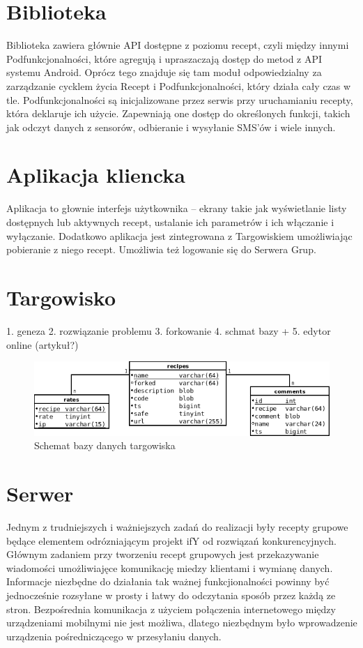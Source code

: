 \documentclass[11pt,a4paper,polish,thesis]{dcsbook}
\begin{document}
\section{Biblioteka}
Biblioteka zawiera głównie API dostępne z poziomu recept, czyli między innymi Podfunkcjonalności, które agregują i upraszaczają dostęp do metod z API systemu Android. Oprócz tego znajduje się tam moduł odpowiedzialny za zarządzanie cycklem życia Recept i Podfunkcjonalności, który działa cały czas w tle. Podfunkcjonalności są inicjalizowane przez serwis przy uruchamianiu recepty, która deklaruje ich użycie. Zapewniają one dostęp do określonych funkcji, takich jak odczyt danych z sensorów, odbieranie i wysyłanie SMS'ów i wiele innych.
\section{Aplikacja kliencka}
Aplikacja to głownie interfejs użytkownika -- ekrany takie jak wyświetlanie listy dostępnych lub aktywnych recept, ustalanie ich parametrów i ich włączanie i wyłączanie. Dodatkowo aplikacja jest zintegrowana z Targowiskiem umożliwiając pobieranie z niego recept. Umożliwia też logowanie się do Serwera Grup.
\section{Targowisko}
1. geneza
2. rozwiązanie problemu
3. forkowanie
4. schmat bazy +
5. edytor online (artykuł?)
\begin{figure}[p]
  \centering
  \includegraphics[scale=0.7]{./resources/market_db.png}
  \caption{Schemat bazy danych targowiska}
  \label{fig:awesome_image}
\end{figure}
\section{Serwer}
Jednym z trudniejszych i ważniejszych zadań do realizacji były recepty grupowe będące elementem odrózniającym projekt if{Y} od rozwiązań konkurencyjnych.
Głównym zadaniem przy tworzeniu recept grupowych jest przekazywanie wiadomości umożliwiajęce komunikację miedzy klientami i wymianę danych. 
Informacje niezbędne do działania tak ważnej funkcjionalności powinny być jednocześnie rozsyłane w prosty i łatwy do odczytania sposób przez każdą ze stron.
Bezpośrednia komunikacja z użyciem połączenia internetowego między urządzeniami mobilnymi nie jest możliwa, dlatego niezbędnym było wprowadzenie urządzenia pośredniczącego w przesyłaniu danych. 
\end{document}
